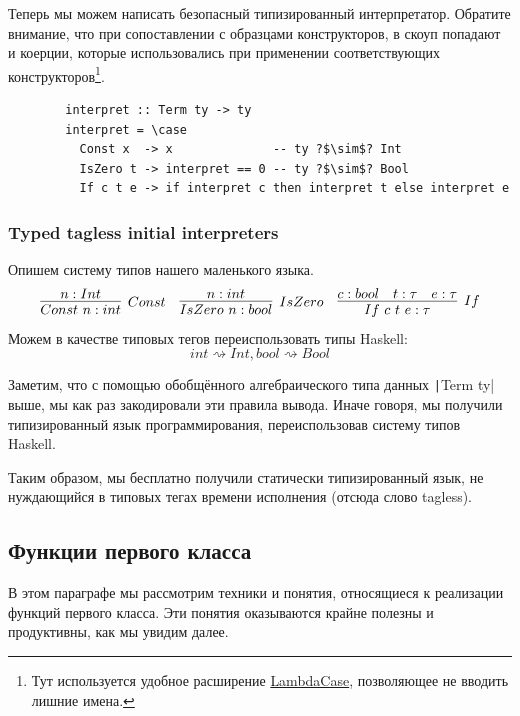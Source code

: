 \documentclass[12pt]{article}
\begin{document}
    Теперь мы можем написать безопасный типизированный интерпретатор.
    Обратите внимание, что при сопоставлении с образцами конструкторов, в скоуп попадают и коерции, которые использовались при применении соответствующих конструкторов\footnote{Тут используется удобное расширение \href{https://downloads.haskell.org/~ghc/9.0.1/docs/html/users_guide/exts/lambda_case.html}{LambdaCase}, позволяющее не вводить лишние имена.}.
    \begin{verbatim}
        interpret :: Term ty -> ty
        interpret = \case
          Const x  -> x              -- ty ?$\sim$? Int
          IsZero t -> interpret == 0 -- ty ?$\sim$? Bool
          If c t e -> if interpret c then interpret t else interpret e
    \end{verbatim}

    \subsubsection{Typed tagless initial interpreters}

    Опишем систему типов нашего маленького языка.
    \begin{equation*}{}
        \infer[Const]{Const~n : int}{n : Int}
        \quad
        \infer[IsZero]{IsZero~n : bool}{n : int}
        \quad
        \infer[If]{If~c~t~e : \tau}{c : bool & t : \tau & e : \tau}
    \end{equation*}
    Можем в качестве типовых тегов переиспользовать типы Haskell: \[int \rightsquigarrow Int, bool \rightsquigarrow Bool\]

    Заметим, что с помощью обобщённого алгебраического типа данных \texttt|Term ty| выше, мы как раз закодировали эти правила вывода.
    Иначе говоря, мы получили типизированный язык программирования, переиспользовав систему типов Haskell.

    Таким образом, мы бесплатно получили статически типизированный язык, не нуждающийся в типовых тегах времени исполнения (отсюда слово tagless).

    \subsection{Функции первого класса} \label{subsec:first-class-functions}

    В этом параграфе мы рассмотрим техники и понятия, относящиеся к реализации функций первого класса.
    Эти понятия оказываются крайне полезны и продуктивны, как мы увидим далее.
\end{document}
